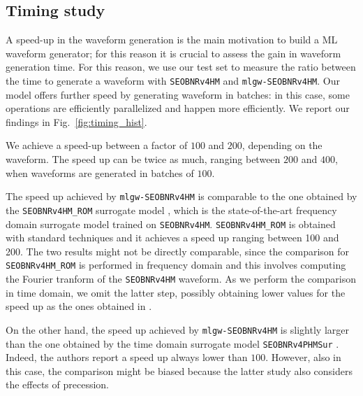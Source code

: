 \documentclass[twocolumn,showpacs,preprintnumbers,nofootinbib,prd,
superscriptaddress,10pt]{revtex4-1}
\begin{document}
{\subsection{Timing study}
\label{sec:timing}

A speed-up in the waveform generation is the main motivation to build a ML waveform generator; for this reason it is crucial to assess the gain in waveform generation time.
For this reason, we use our test set to measure the ratio between the time to generate a waveform with \texttt{SEOBNRv4HM} and \texttt{mlgw-SEOBNRv4HM}. Our model offers further speed by generating waveform in batches: in this case, some operations are efficiently parallelized and happen more efficiently.
We report our findings in Fig.~\ref{fig:timing_hist}.

We achieve a speed-up between a factor of $100$ and $200$, depending on the waveform.
The speed up can be twice as much, ranging between $200$ and $400$, when waveforms are generated in batches of $100$.

The speed up achieved by \texttt{mlgw-SEOBNRv4HM} is comparable to the one obtained by the \texttt{SEOBNRv4HM\_ROM} surrogate model \cite{Cotesta:2020qhw}, which is the state-of-the-art frequency domain surrogate model trained on \texttt{SEOBNRv4HM}. \texttt{SEOBNRv4HM\_ROM} is obtained with standard techniques and it achieves a speed up ranging between 100 and 200.
The two results might not be directly comparable, since the comparison for \texttt{SEOBNRv4HM\_ROM} is performed in frequency domain and this involves computing the Fourier tranform of the \texttt{SEOBNRv4HM} waveform. As we perform the comparison in time domain, we omit the latter step, possibly obtaining lower values for the speed up as the ones obtained in \cite{Cotesta:2020qhw}. 

On the other hand, the speed up achieved by \texttt{mlgw-SEOBNRv4HM} is slightly larger than the one obtained by the time domain surrogate model \texttt{SEOBNRv4PHMSur} \cite{Gadre:2022sed}. Indeed, the authors report a speed up always lower than $100$. However, also in this case, the comparison might be biased because the latter study also considers the effects of precession.

}
\end{document}
